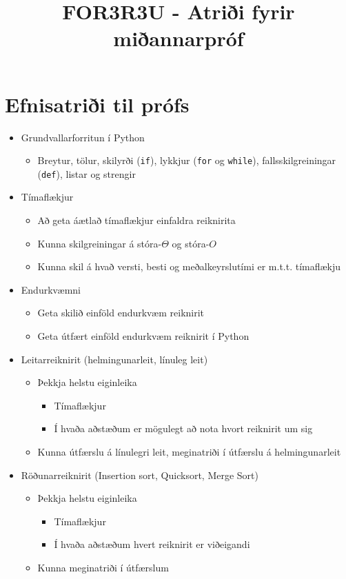 \documentclass{article}
\title{FOR3R3U - Atriði fyrir miðannarpróf}
\begin{document}
\maketitle
\section{Efnisatriði til prófs}

\begin{itemize}
 \item Grundvallarforritun í Python
 \begin{itemize}
  \item Breytur, tölur, skilyrði (\texttt{if}), lykkjur (\texttt{for} og \texttt{while}), fallsskilgreiningar (\texttt{def}), listar og strengir
 \end{itemize}
 \item Tímaflækjur
 \begin{itemize}
  \item Að geta áætlað tímaflækjur einfaldra reiknirita
  \item Kunna skilgreiningar á stóra-$\Theta$ og stóra-$O$
  \item Kunna skil á hvað versti, besti og meðalkeyrslutími er m.t.t. tímaflækju
 \end{itemize}
 \item Endurkvæmni
 \begin{itemize}
  \item Geta skilið einföld endurkvæm reiknirit
  \item Geta útfært einföld endurkvæm reiknirit í Python
 \end{itemize}
 \item Leitarreiknirit (helmingunarleit, línuleg leit)
 \begin{itemize}
  \item Þekkja helstu eiginleika
  \begin{itemize}
   \item Tímaflækjur
   \item Í hvaða aðstæðum er mögulegt að nota hvort reiknirit um sig
  \end{itemize}
  \item Kunna útfærslu á línulegri leit, meginatriði í útfærslu á helmingunarleit
 \end{itemize}
 \item Röðunarreiknirit (Insertion sort, Quicksort, Merge Sort)
 \begin{itemize}
  \item Þekkja helstu eiginleika
  \begin{itemize}
   \item Tímaflækjur
   \item Í hvaða aðstæðum hvert reiknirit er viðeigandi
  \end{itemize}
  \item Kunna meginatriði í útfærslum
 \end{itemize} 
\end{itemize}
\end{document}
